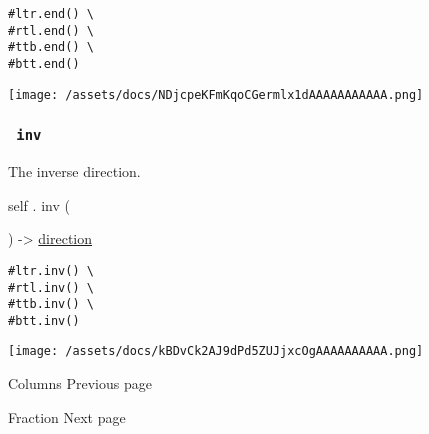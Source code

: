 \begin{verbatim}
#ltr.end() \
#rtl.end() \
#ttb.end() \
#btt.end()
\end{verbatim}

\texttt{[image: /assets/docs/NDjcpeKFmKqoCGermlx1dAAAAAAAAAAA.png]}

\subsubsection{\texorpdfstring{\texttt{\ inv\ }}{ inv }}\label{definitions-inv}

The inverse direction.

self { . } { inv } (

) -\textgreater{} \href{/docs/reference/layout/direction/}{direction}

\begin{verbatim}
#ltr.inv() \
#rtl.inv() \
#ttb.inv() \
#btt.inv()
\end{verbatim}

\texttt{[image: /assets/docs/kBDvCk2AJ9dPd5ZUJjxcOgAAAAAAAAAA.png]}

\href{/docs/reference/layout/columns/}{\pandocbounded{}}

{ Columns } { Previous page }

\href{/docs/reference/layout/fraction/}{\pandocbounded{}}

{ Fraction } { Next page }
